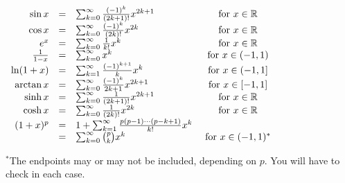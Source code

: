 \documentclass[12pt, addpoints]{exam/exam}
\newcommand{\1}{^{-1}}
\newcommand{\R}{\mathbb R}
\theoremstyle{plain}
\begin{document}
\begin{coverpages}
$
\begin{array}{r c l c}
\sin x &=& \sum_{k=0}^{\infty}\frac{(-1)^k}{(2k+1)!}x^{2k+1} & \text{ for }x\in\R \\
\cos x &=& \sum_{k=0}^{\infty}\frac{(-1)^k}{(2k)!}x^{2k} & \text{ for }x\in\R \\
e^x &=& \sum_{k=0}^{\infty}\frac{1}{k!}x^k & \text{ for }x\in\R \\
\frac{1}{1-x} &=& \sum_{k=0}^{\infty}x^k & \text{ for }x\in(-1,1) \\
\ln(1+x) &=& \sum_{k=1}^{\infty}\frac{(-1)^{k+1}}{k}x^k & \text{ for }x\in\left(-1,1\right] \\
\arctan x &=& \sum_{k=0}^{\infty}\frac{(-1)^k}{2k+1}x^{2k+1} & \text{ for }x\in[-1,1] \\
\sinh x &=& \sum_{k=0}^{\infty}\frac{1}{(2k+1)!}x^{2k+1} & \text{ for }x\in\R \\
\cosh x &=& \sum_{k=0}^{\infty}\frac{1}{(2k)!}x^{2k} & \text{ for }x\in\R \\
(1+x)^p &=& 1+\sum_{k=1}^{\infty}\frac{p(p-1)\cdots(p-k+1)}{k!}x^k & \\
 &=& \sum_{k=0}^{\infty}\binom{p}{k}x^k & \text{ for }x\in(-1,1)^*
\end{array}
$

$^*$The endpoints may or may not be included, depending on $p$.  You will have to check in each case.
%

\vspace*{\fill}

\vfill

\vspace{-2pc}
\end{coverpages}
\end{document}

